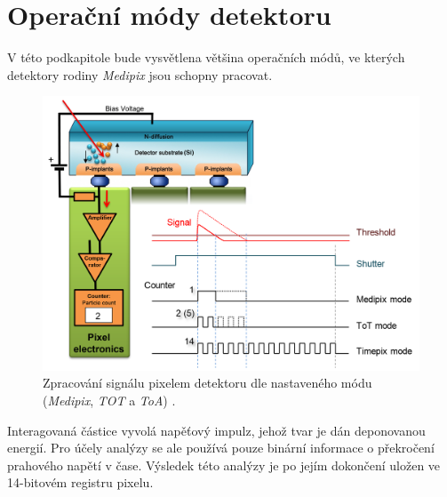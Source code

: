 \section{Operační módy detektoru}\label{chap:detectors:operation_modes}
V této podkapitole bude vysvětlena většina operačních módů, ve kterých detektory rodiny \textit{Medipix} jsou schopny pracovat. 

\begin{figure}[th]
	\begin{center}
		\includegraphics[width=14cm]{figures/det_pix.png}
		\caption{Zpracování signálu pixelem detektoru dle nastaveného módu (\textit{Medipix}, \textit{TOT} a \textit{ToA}) \cite{PlatkevicDisertace}.}
		\label{fig:det:modes}
	\end{center}
\end{figure}

Interagovaná částice vyvolá napěťový impulz, jehož tvar je dán deponovanou energií. Pro účely analýzy se ale používá pouze binární informace o překročení prahového napětí v čase. Výsledek této analýzy je po jejím dokončení uložen ve 14-bitovém registru pixelu.

